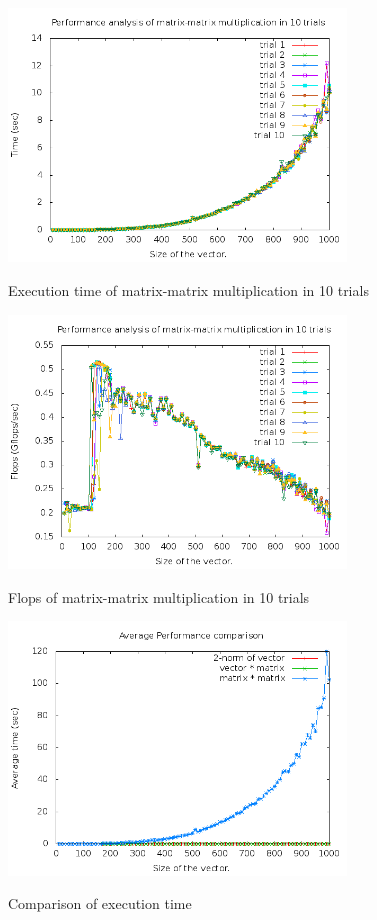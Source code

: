 \documentclass{article}
\begin{document}
    \begin{figure}[th!]
        \centering
        \includegraphics[width=0.8\textwidth]{timingMatMul.png}
        \label{fig:timeMatMul}
        \caption{Execution time of matrix-matrix multiplication in 10 trials}
    \end{figure}

    \begin{figure}[th!]
        \centering
        \includegraphics[width=0.8\textwidth]{flopsMatMul.png}
        \label{fig:flopsMatMul}
        \caption{Flops of matrix-matrix multiplication in 10 trials}
    \end{figure}

    \begin{figure}[th!]
        \centering
        \includegraphics[width=0.8\textwidth]{timingAvg.png}
        \label{fig:timeAvg}
        \caption{Comparison of execution time}
    \end{figure}
\end{document}
